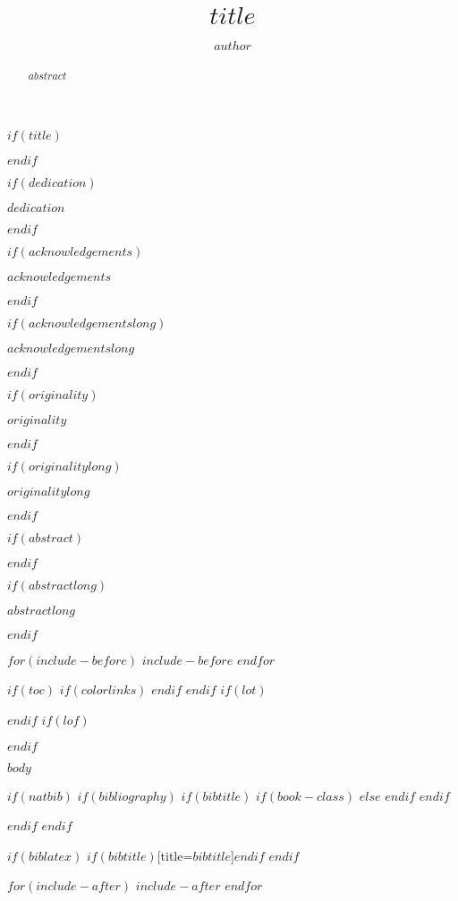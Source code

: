 \documentclass[a4paper, 11pt, twoside]{$thesis_class$}
\title{$title$}            %
\author{$author$}          %
\begin{document}
$if(title)$
\maketitle
$endif$

$if(dedication)$
\begin{dedication}
$dedication$
\end{dedication}
$endif$

$if(acknowledgements)$
\begin{acknowledgements}
$acknowledgements$
\end{acknowledgements}
$endif$

$if(acknowledgementslong)$
\begin{acknowledgementslong}
$acknowledgementslong$
\end{acknowledgementslong}
$endif$

$if(originality)$
\begin{originality}
$originality$
\end{originality}
$endif$

$if(originalitylong)$
\begin{originalitylong}
$originalitylong$
\end{originalitylong}
$endif$

$if(abstract)$
\begin{abstract}
$abstract$
\end{abstract}
$endif$

$if(abstractlong)$
\begin{abstractlong}
$abstractlong$
\end{abstractlong}
$endif$

$for(include-before)$
$include-before$
$endfor$

\begin{romanpages}
$if(toc)$
{%
$if(colorlinks)$
\hypersetup{linkcolor=black}
$endif$
\setcounter{tocdepth}{$toc-depth$}
\tableofcontents
}
$endif$
$if(lot)$
\listoftables
$endif$
$if(lof)$
\listoffigures
$endif$
\end{romanpages}

$body$

$if(natbib)$
$if(bibliography)$
$if(bibtitle)$
$if(book-class)$
\renewcommand\bibname{$bibtitle$}
$else$
\renewcommand\refname{$bibtitle$}
$endif$
$endif$

$endif$
$endif$

$if(biblatex)$
\printbibliography$if(bibtitle)$[title=$bibtitle$]$endif$
$endif$

$for(include-after)$
$include-after$
$endfor$
\end{document}
